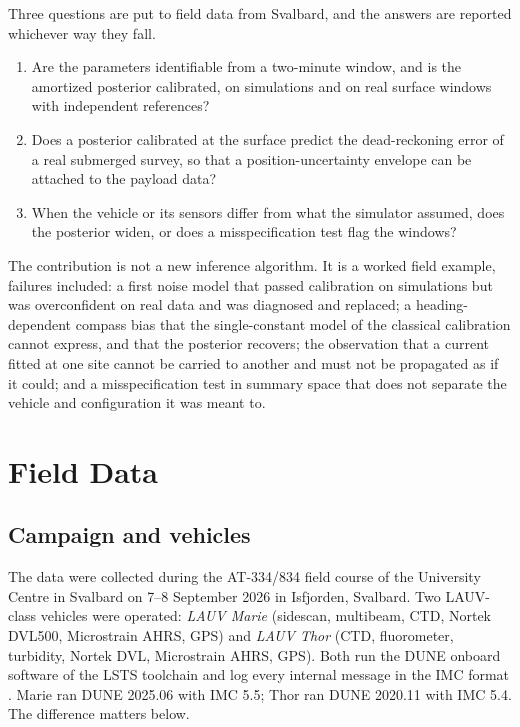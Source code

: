 \documentclass[conference]{IEEEtran}
\begin{document}
Three questions are put to field data from Svalbard, and the answers are reported whichever way they fall.
\begin{enumerate}
  \item Are the parameters identifiable from a two-minute window, and is the amortized posterior calibrated, on simulations and on real surface windows with independent references?
  \item Does a posterior calibrated at the surface predict the dead-reckoning error of a real submerged survey, so that a position-uncertainty envelope can be attached to the payload data?
  \item When the vehicle or its sensors differ from what the simulator assumed, does the posterior widen, or does a misspecification test flag the windows?
\end{enumerate}

The contribution is not a new inference algorithm. It is a worked field example, failures included: a first noise model that passed calibration on simulations but was overconfident on real data and was diagnosed and replaced; a heading-dependent compass bias that the single-constant model of the classical calibration cannot express, and that the posterior recovers; the observation that a current fitted at one site cannot be carried to another and must not be propagated as if it could; and a misspecification test in summary space that does not separate the vehicle and configuration it was meant to.

\section{Field Data}

\subsection{Campaign and vehicles}

The data were collected during the AT-334/834 field course of the University Centre in Svalbard on 7--8 September 2026 in Isfjorden, Svalbard. Two LAUV-class vehicles \cite{sousa2012lauv} were operated: \emph{LAUV Marie} (sidescan, multibeam, CTD, Nortek DVL500, Microstrain AHRS, GPS) and \emph{LAUV Thor} (CTD, fluorometer, turbidity, Nortek DVL, Microstrain AHRS, GPS). Both run the DUNE onboard software of the LSTS toolchain \cite{pinto2013lsts} and log every internal message in the IMC format \cite{martins2009imc}. Marie ran DUNE 2025.06 with IMC 5.5; Thor ran DUNE 2020.11 with IMC 5.4. The difference matters below.
\end{document}
